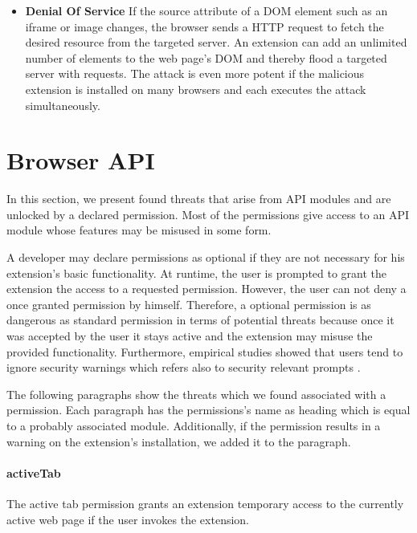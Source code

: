 \begin{itemize}
		\item \textbf{Denial Of Service} If the source attribute of a DOM element such as an iframe or image changes, the browser sends a HTTP request to fetch the desired resource from the targeted server. An extension can add an unlimited number of elements to the web page's DOM and thereby flood a targeted server with requests. The attack is even more potent if the malicious extension is installed on many browsers and each executes the attack simultaneously.
	\end{itemize}
	
\section{Browser API}
	
	In this section, we present found threats that arise from API modules and are unlocked by a declared permission. Most of the permissions give access to an API module whose features may be misused in some form. 
	
	A developer may declare permissions as optional if they are not necessary for his extension's basic functionality. At runtime, the user is prompted to grant the extension the access to a requested permission. However, the user can not deny a once granted permission by himself. Therefore, a optional permission is as dangerous as standard permission in terms of potential threats because once it was accepted by the user it stays active and the extension may misuse the provided functionality. Furthermore, empirical studies showed that users tend to ignore security warnings which refers also to security relevant prompts \cite{180371, sunshine2009crying}.
		
	The following paragraphs show the threats which we found associated with a permission. Each paragraph has the permissions's name as heading which is equal to a probably associated module. Additionally, if the permission results in a warning on the extension's installation, we added it to the paragraph.
	
\newenvironment{permissionwarning}{%
	\setlength\topsep{4pt}
	\setlength\parskip{0pt}
	\itshape
\begin{center}
	}{%
\end{center}
}

\paragraph{activeTab}
	The active tab permission grants an extension temporary access to the currently active web page if the user invokes the extension. 
	
